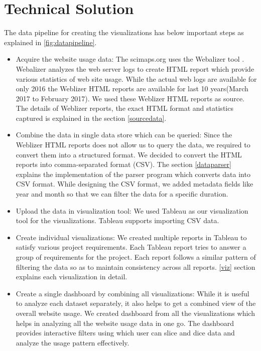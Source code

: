 \section{Technical Solution} \label{techsol}

The data pipeline for creating the visualizations has below important steps
as explained in \ref{fig:datapipeline}.

\begin{itemize}
\item Acquire the website usage data:
The scimaps.org uses the Webalizer tool \cite{weblizer}.
Webalizer
analyzes the web server logs to create HTML report which provide various
statistics of web site usage. While the actual web logs are available for
only 2016 the Weblizer HTML reports are available for last 10 years(March
2017 to February 2017). We used these Weblizer HTML reports as source. The
details of Weblizer reports, the exact HTML format and statistics captured is
 explained in the section \ref{sourcedata}.

\item Combine the data in single data store which can be queried:
Since the Weblizer HTML reports does not allow us to query the data, we
required to convert them into a structured format. We decided to convert the
HTML reports into comma-separated format (CSV). The section \ref{dataparser}
explains the implementation of the parser program which converts data into
CSV format. While designing the CSV format, we added metadata fields like
year and month so that we can filter the data for a specific duration.

\item Upload the data in visualization tool:
We used Tableau \cite{tableau} as our visualization tool for the
visualizations. Tableau supports importing CSV data.
\item Create individual visualizations:
We created multiple reports in Tableau to satisfy various project
requirements. Each Tableau report tries to answer a group of requirements for
 the project. Each report follows a similar pattern of filtering the data so
 as to maintain consistency across all reports. \ref{viz} section explains
 each visualization in detail.
\item Create a single dashboard by combining all visualizations:
While it is useful to analyze each dataset separately, it also helps to get a
 combined view of the overall website usage. We created dashboard from all
 the visualizations which helps in analyzing all the website usage data in
 one go. The dashboard provides interactive filters using which user can
 slice and dice data and analyze the usage pattern effectively.
\end{itemize}

